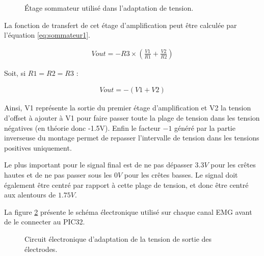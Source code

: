 \documentclass[letterpaper, twoside, 12pt, memoire, creativecommons, hyperref]{thETS}
\begin{document}
\begin{figure}
	\centering
	\caption{Étage sommateur utilisé dans l'adaptation de tension.}
	\label{fig:sommateur1}
\end{figure}

La fonction de transfert de cet étage d'amplification peut être calculée par l'équation \ref{eq:sommateur1}. 

\begin{align}\label{eq:sommateur1}
   Vout = -R3 \times ( \frac{V1}{R1} + \frac{V2}{R2})
\end{align}

Soit, si $R1 = R2 = R3$ : 

\begin{align}\label{eq:sommateur2}
   Vout = -(V1 + V2)
\end{align}

Ainsi, V1 représente la sortie du premier étage d'amplification et V2 la tension d'offset à ajouter à V1 pour faire passer toute la plage de tension dans les tension négatives (en théorie donc -1.5V). Enfin le facteur $-1$ généré par la partie inverseuse du montage permet de repasser l'intervalle de tension dans les tensions positives uniquement.

Le plus important pour le signal final est de ne pas dépasser $3.3V$ pour les crêtes hautes et de ne pas passer sous les $0V$ pour les crêtes basses. Le signal doit également être centré par rapport à cette plage de tension, et donc être centré aux alentours de $1.75V$.

La figure \ref{fig:adapttension} présente le schéma électronique utilisé sur chaque canal EMG avant de le connecter au PIC32.

\begin{figure}
	\centering
	\caption{Circuit électronique d'adaptation de la tension de sortie des électrodes.}
	\label{fig:adapttension}
\end{figure}
\end{document}
